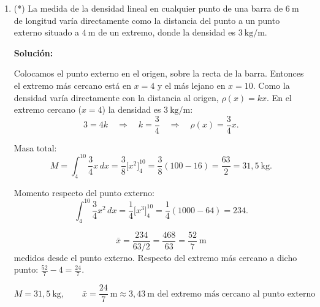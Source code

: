 \documentclass[12pt]{article}
\newcommand{\solucion}{%
    \vspace{0.8em}%
    \textbf{Solución:}%
}
\begin{document}
\begin{enumerate}[label=\alph*.-]
    Ubicamos el extremo izquierdo en $x=0$. Como la densidad es lineal,
    $\rho(x)=mx+n$, con $\rho(0)=3$ y $\rho(12)=4$:
    \[
    n=3,
    \qquad
    m=\frac{4-3}{12-0}=\frac{1}{12}
    \quad\Rightarrow\quad
    \rho(x)=3+\frac{x}{12}.
    \]

    Masa total:
    \[
    M=\int_{0}^{12}\left(3+\frac{x}{12}\right)dx
    =\left[3x+\frac{x^2}{24}\right]_{0}^{12}=36+6=42\ \text{g}.
    \]

    Momento respecto del extremo izquierdo:
    \[
    \int_{0}^{12}x\left(3+\frac{x}{12}\right)dx
    =\left[\frac32x^2+\frac{x^3}{36}\right]_{0}^{12}=216+48=264.
    \]

    \[
    \bar x=\frac{264}{42}=\frac{44}{7}.
    \]

    \[
    \boxed{
    M=42\ \text{g},
    \qquad
    \bar x=\frac{44}{7}\ \text{cm}\approx6{,}29\ \text{cm del extremo izquierdo}
    }
    \]


    \item (*) La medida de la densidad lineal en cualquier punto de una
    barra de $6\ \text{m}$ de longitud varía directamente como la
    distancia del punto a un punto externo situado a $4\ \text{m}$ de un
    extremo, donde la densidad es $3\ \text{kg/m}$.

    \solucion

    Colocamos el punto externo en el origen, sobre la recta de la barra.
    Entonces el extremo más cercano está en $x=4$ y el más lejano en
    $x=10$. Como la densidad varía directamente con la distancia al
    origen, $\rho(x)=kx$. En el extremo cercano ($x=4$) la densidad es
    $3\ \text{kg/m}$:
    \[
    3=4k
    \quad\Rightarrow\quad
    k=\frac34
    \quad\Rightarrow\quad
    \rho(x)=\frac34x.
    \]

    Masa total:
    \[
    M=\int_{4}^{10}\frac34x\,dx=\frac38\Big[x^2\Big]_{4}^{10}
    =\frac38(100-16)=\frac{63}{2}=31{,}5\ \text{kg}.
    \]

    Momento respecto del punto externo:
    \[
    \int_{4}^{10}\frac34x^2\,dx=\frac14\Big[x^3\Big]_{4}^{10}
    =\frac14(1000-64)=234.
    \]

    \[
    \bar x=\frac{234}{63/2}=\frac{468}{63}=\frac{52}{7}\ \text{m}
    \]
    medidos desde el punto externo. Respecto del extremo más cercano a
    dicho punto: $\frac{52}{7}-4=\frac{24}{7}$.

    \[
    \boxed{
    M=31{,}5\ \text{kg},
    \qquad
    \bar x=\frac{24}{7}\ \text{m}\approx3{,}43\ \text{m del extremo más cercano al punto externo}
    }
    \]

\end{enumerate}
\end{document}
